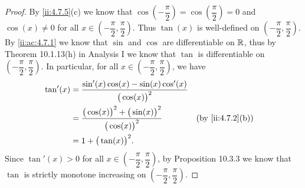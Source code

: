 \begin{proof}
  By \cref{ii:4.7.5}(c) we know that \(\cos(-\dfrac{\pi}{2}) = \cos(\dfrac{\pi}{2}) = 0\) and \(\cos(x) \neq 0\) for all \(x \in (-\dfrac{\pi}{2}, \dfrac{\pi}{2})\).
  Thus \(\tan(x)\) is well-defined on \((-\dfrac{\pi}{2}, \dfrac{\pi}{2})\).
  By \cref{ii:ac:4.7.1} we know that \(\sin\) and \(\cos\) are differentiable on \(\mathbb{R}\), thus by Theorem 10.1.13(h) in Analysis I we know that \(\tan\) is differentiable on \((-\dfrac{\pi}{2}, \dfrac{\pi}{2})\).
  In particular, for all \(x \in (-\dfrac{\pi}{2}, \dfrac{\pi}{2})\), we have
  \begin{align*}
    \tan'(x) & = \dfrac{\sin'(x) \cos(x) - \sin(x) \cos'(x)}{\big(\cos(x)\big)^2}                             \\
             & = \dfrac{\big(\cos(x)\big)^2 + \big(\sin(x)\big)^2}{\big(\cos(x)\big)^2} &  & \by{ii:4.7.2}[b] \\
             & = 1 + \big(\tan(x)\big)^2.
  \end{align*}
  Since \(\tan'(x) > 0\) for all \(x \in (-\dfrac{\pi}{2}, \dfrac{\pi}{2})\), by Proposition 10.3.3 we know that \(\tan\) is strictly monotone increasing on \((-\dfrac{\pi}{2}, \dfrac{\pi}{2})\).


\end{proof}
